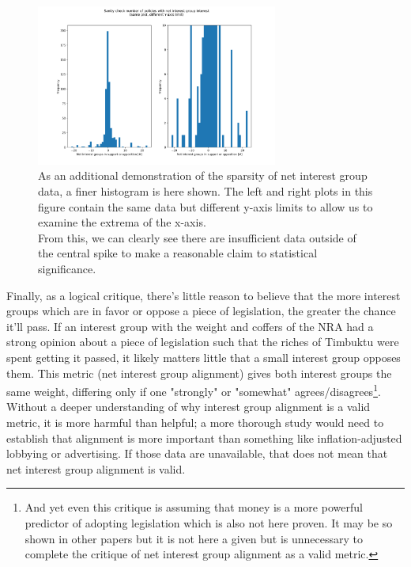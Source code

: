\documentclass[]{article}
\begin{document}
\begin{figure}[H]
	\begin{center}
		\includegraphics[width=300px]{./figures/generated/interest-group-count-histogram.png}
	\end{center}	
	\caption{As an additional demonstration of the sparsity of net interest group data, a finer histogram is here shown. The left and right plots in this figure contain the same data but different y-axis limits to allow us to examine the extrema of the x-axis. \\From this, we can clearly see there are insufficient data outside of the central spike to make a reasonable claim to statistical significance.}
	\label{generated_figure1c_data_sparsity}
\end{figure}

Finally, as a logical critique, there's little reason to believe that the more interest groups which are in favor or oppose a piece of legislation, the greater the chance it'll pass.
If an interest group with the weight and coffers of the NRA had a strong opinion about a piece of legislation such that the riches of Timbuktu were spent getting it passed, it likely matters little that a small interest group opposes them. 
This metric (net interest group alignment) gives both interest groups the same weight, differing only if one "strongly" or "somewhat" agrees/disagrees\footnote{And yet even this critique is assuming that money is a more powerful predictor of adopting legislation which is also not here proven. It may be so shown in other papers but it is not here a given but is unnecessary to complete the critique of net interest group alignment as a valid metric.}. Without a deeper understanding of why interest group alignment is a valid metric, it is more harmful than helpful; a more thorough study would need to establish that alignment is more important than something like inflation-adjusted lobbying or advertising. If those data are unavailable, that does not mean that net interest group alignment is valid.
\end{document}
